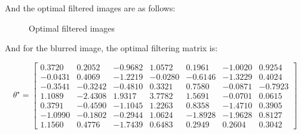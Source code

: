 \documentclass[paper=a4, fontsize=11pt]{scrartcl} %
\numberwithin{equation}{section} %
\numberwithin{figure}{section} %
\numberwithin{table}{section} %
\begin{document}
And the optimal filtered images are as follows:
 
\begin{figure}[H]
	
	\centering
	\hspace{1in}

	\caption{ Optimal filtered images}
	
\end{figure}

And for the blurred image, the  optimal filtering matrix is: 

\[
\theta^{\star} = 
\begin{bmatrix}
   0.3720   & 0.2052   &-0.9682   & 1.0572 &0.1961   &-1.0020    &0.9254 \\
-0.0431    &0.4069  & -1.2219 &  -0.0280 &-0.6146  & -1.3229    &0.4024\\
-0.3541   &-0.3242   &-0.4810   & 0.3321 &0.7580  & -0.0871   &-0.7923\\
1.1089   &-2.4308    &1.9317   & 3.7782 &1.5691  & -0.0701    &0.0615\\
0.3791   &-0.4590  & -1.1045  &  1.2263& 0.8358  & -1.4710    &0.3905\\
-1.0990   &-0.1802  & -0.2944  &  1.0624 &-1.8928   &-1.9628    &0.8127\\
1.1560    &0.4776   &-1.7439  &  0.6483 &0.2949   & 0.2604   & 0.3042




\end{bmatrix}
\]
\end{document}
